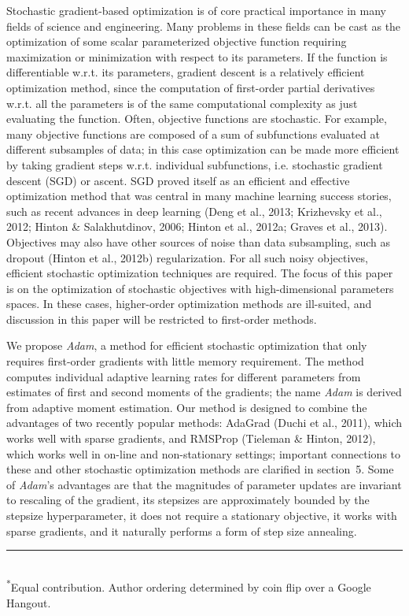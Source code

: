 \documentclass[11pt]{article}
\begin{document}
Stochastic gradient-based optimization is of core practical importance
in many fields of science and engineering. Many problems in these
fields can be cast as the optimization of some scalar parameterized
objective function requiring maximization or minimization with respect
to its parameters. If the function is differentiable w.r.t. its
parameters, gradient descent is a relatively efficient optimization
method, since the computation of first-order partial derivatives
w.r.t. all the parameters is of the same computational complexity as
just evaluating the function. Often, objective functions are
stochastic. For example, many objective functions are composed of a
sum of subfunctions evaluated at different subsamples of data; in this
case optimization can be made more efficient by taking gradient steps
w.r.t. individual subfunctions, i.e. stochastic gradient descent (SGD)
or ascent. SGD proved itself as an efficient and effective
optimization method that was central in many machine learning success
stories, such as recent advances in deep learning (Deng et al., 2013;
Krizhevsky et al., 2012; Hinton \& Salakhutdinov, 2006; Hinton et al.,
2012a; Graves et al., 2013). Objectives may also have other sources
of noise than data subsampling, such as dropout (Hinton et al.,
2012b) regularization. For all such noisy objectives, efficient
stochastic optimization techniques are required. The focus of this
paper is on the optimization of stochastic objectives with
high-dimensional parameters spaces. In these cases, higher-order
optimization methods are ill-suited, and discussion in this paper
will be restricted to first-order methods.

We propose \emph{Adam}, a method for efficient stochastic optimization
that only requires first-order gradients with little memory
requirement. The method computes individual adaptive learning rates
for different parameters from estimates of first and second moments
of the gradients; the name \emph{Adam} is derived from adaptive
moment estimation. Our method is designed to combine the advantages
of two recently popular methods: AdaGrad (Duchi et al., 2011), which
works well with sparse gradients, and RMSProp (Tieleman \& Hinton,
2012), which works well in on-line and non-stationary settings;
important connections to these and other stochastic optimization
methods are clarified in section~5. Some of \emph{Adam}'s advantages
are that the magnitudes of parameter updates are invariant to
rescaling of the gradient, its stepsizes are approximately bounded by
the stepsize hyperparameter, it does not require a stationary
objective, it works with sparse gradients, and it naturally performs
a form of step size annealing.

\vspace{2em}

\noindent\rule{0.3\textwidth}{0.4pt}\\[0.3em]
{\footnotesize\textsuperscript{*}Equal contribution. Author ordering
determined by coin flip over a Google Hangout.}

\end{document}
